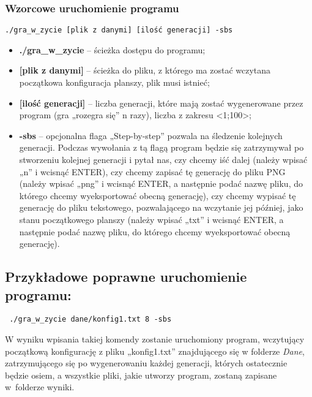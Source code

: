 \documentclass[12pt]{report}
\newcommand{\code}[1]{\texttt{#1}}
\begin{document}
\subsubsection{Wzorcowe uruchomienie programu}
\code{./gra\_w\_zycie [plik z danymi] [ilość generacji] -sbs }
\begin{itemize}
  \item \textbf{./gra\_w\_zycie} – ścieżka dostępu do programu;
  \item \textbf{[plik z danymi]} – ścieżka do pliku, z którego ma zostać wczytana początkowa konfiguracja planszy, plik musi istnieć;
  \item \textbf{[ilość generacji]} –  liczba generacji, które mają zostać wygenerowane przez program (gra „rozegra się” n razy), liczba z zakresu <1;100>;
  \item \textbf{-sbs} – opcjonalna flaga „Step-by-step” pozwala na śledzenie kolejnych generacji. Podczas wywołania z tą flagą program będzie się zatrzymywał po stworzeniu kolejnej generacji i pytał nas, czy chcemy iść dalej (należy wpisać „n” i wcisnąć ENTER), czy chcemy zapisać tę generację do pliku PNG (należy wpisać „png” i wcisnąć ENTER, a następnie podać nazwę pliku, do którego chcemy wyeksportować obecną generację), czy chcemy wypisać tę generację do pliku tekstowego, pozwalającego na wczytanie jej później, jako stanu początkowego planszy (należy wpisać „txt” i wcisnąć ENTER, a następnie podać nazwę pliku, do którego chcemy wyeksportować obecną generację).
\end{itemize}
\subsection{Przykładowe poprawne uruchomienie programu:}
\code{ ./gra\_w\_zycie dane/konfig1.txt 8 -sbs }\par\noident
W wyniku wpisania takiej komendy zostanie uruchomiony program, wczytujący początkową konfigurację z pliku „konfig1.txt” znajdującego się w folderze \textit{Dane}, zatrzymującego się po wygenerowaniu każdej generacji, których ostatecznie będzie osiem, a wszystkie pliki, jakie utworzy program, zostaną zapisane w~folderze wyniki.
\end{document}
